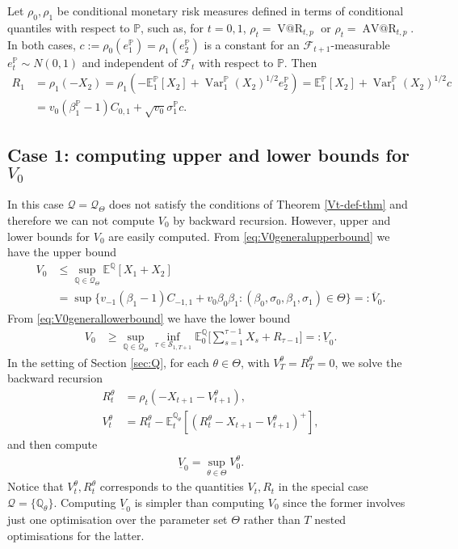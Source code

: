 \documentclass[11pt,a4paper]{article}
\makeatletter
\newcommand{\E}{\mathbb{E}}
\newcommand{\VaR}{\operatorname{V@R}}
\newcommand{\AVaR}{\operatorname{AV@R}}
\renewcommand{\P}{\mathbb{P}}
\newcommand{\Q}{\mathbb{Q}}
\newcommand{\Var}{\operatorname{Var}}
\newcommand{\calF}{\mathcal{F}}
\newcommand{\calQ}{\mathcal{Q}}
\makeatother
\begin{document}
Let $\rho_0,\rho_1$ be conditional monetary risk measures defined in terms of conditional quantiles with respect to $\P$, such as, for $t=0,1$, $\rho_t=\VaR_{t,p}$ or $\rho_t=\AVaR_{t,p}$. In both cases, $c:=\rho_0(e^{\P}_{1})=\rho_1(e^\P_{2})$ is a constant for an $\calF_{t+1}$-measurable $e^{\P}_{t}\sim N(0,1)$ and independent of $\calF_t$ with respect to $\P$.   
Then 
\begin{align*}
R_1&=\rho_1(-X_2)
=\rho_1(-\E^\P_1[X_{2}]+\Var^\P_1(X_{2})^{1/2}e^{\P}_{2})
=\E^\P_1[X_{2}]+\Var^\P_1(X_{2})^{1/2}c\\
&=v_0(\beta_1^{\P}-1)C_{0,1}+\sqrt{v_0}\sigma_1^{\P}c.
\end{align*}

\subsection{Case 1: computing upper and lower bounds for $V_0$}

In this case $\calQ=\calQ_{\Theta}$ does not satisfy the conditions of Theorem \ref{Vt-def-thm} and therefore we can not compute $V_0$ by backward recursion. However, upper and lower bounds for $V_0$ are easily computed. 
From \eqref{eq:V0generalupperbound} we have the upper bound 
\begin{align}
V_0&\leq \sup_{\Q\in\calQ_{\Theta}}\E^{\Q}[X_1+X_2] \nonumber \\
&=\sup\Big\{v_{-1}(\beta_1-1)C_{-1,1}+v_0\beta_0\beta_1:(\beta_0,\sigma_0,\beta_1,\sigma_1)\in\Theta\Big\}=:\overline{V}_0. \label{eq:V0_bound_gauss}
\end{align}
From \eqref{eq:V0generallowerbound} we have the lower bound 
\begin{align*}
V_0&\geq \sup_{\Q \in \calQ_{\Theta}}\inf_{\tau \in \mathcal{S}_{1,T+1}}\E_0^{\Q}\bigg[\sum_{s=1}^{\tau-1}X_s+R_{\tau-1}\bigg] 
=: \underline{V}_0.
\end{align*}
In the setting of Section \ref{sec:Q}, for each $\theta\in\Theta$, with $V_T^{\theta}=R_T^{\theta}=0$, we solve the backward recursion 
\begin{align*}
R_t^{\theta}&=\rho_t(-X_{t+1}-V_{t+1}^{\theta}), \\
V_t^{\theta}&=R_{t}^{\theta}-\E^{\Q_{\theta}}_{t}[(R_{t}^{\theta}-X_{t+1}-V_{t+1}^{\theta})^{+}], 
\end{align*}
and then compute  
\begin{align*}
\underline{V}_0=\sup_{\theta \in \Theta}V_0^{\theta}. 
\end{align*}
Notice that $V_t^{\theta},R_t^{\theta}$ corresponds to the quantities $V_t,R_t$ in the special case $\calQ=\{\Q_{\theta}\}$. 
Computing $\underline{V}_0$ is simpler than computing $V_0$ since the former involves just one optimisation over the parameter set $\Theta$ rather than $T$ nested optimisations for the latter. 
\end{document}
